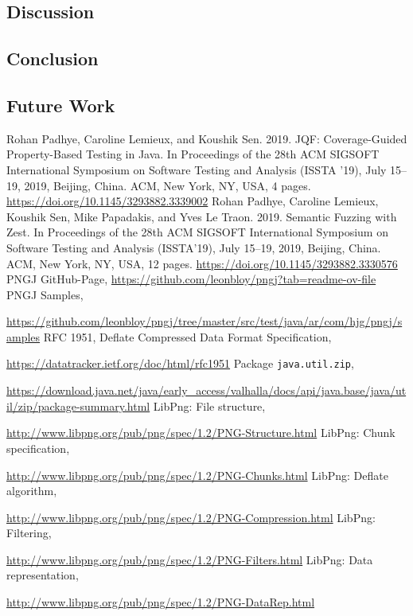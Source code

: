 \documentclass[runningheads]{llncs}
\begin{document}
\subsection{Discussion}
\subsection{Conclusion}
\subsection{Future Work}

%
%
%
% 
% 
%
\begin{thebibliography}{8}
Rohan Padhye, Caroline Lemieux, and Koushik Sen. 2019. JQF: Coverage-Guided Property-Based Testing in Java. In Proceedings of the 28th ACM SIGSOFT International Symposium on Software Testing and Analysis (ISSTA ’19), July 15–19, 2019, Beijing, China. ACM, New York, NY, USA, 4 pages. \url{https://doi.org/10.1145/3293882.3339002}
Rohan Padhye, Caroline Lemieux, Koushik Sen, Mike Papadakis, and Yves Le Traon. 2019. Semantic Fuzzing with Zest. In Proceedings of the 28th ACM SIGSOFT International Symposium on Software Testing and Analysis (ISSTA’19), July 15–19, 2019, Beijing, China. ACM, New York, NY, USA, 12 pages. \url{https://doi.org/10.1145/3293882.3330576}
PNGJ GitHub-Page, \url{https://github.com/leonbloy/pngj?tab=readme-ov-file}
PNGJ Samples, 

\url{https://github.com/leonbloy/pngj/tree/master/src/test/java/ar/com/hjg/pngj/samples}
RFC 1951, Deflate Compressed Data Format Specification,

\url{https://datatracker.ietf.org/doc/html/rfc1951}
Package \texttt{java.util.zip},

\url{https://download.java.net/java/early\_access/valhalla/docs/api/java.base/java/util/zip/package-summary.html}
LibPng: File structure,

\url{http://www.libpng.org/pub/png/spec/1.2/PNG-Structure.html}
LibPng: Chunk specification, 

\url{http://www.libpng.org/pub/png/spec/1.2/PNG-Chunks.html}
LibPng: Deflate algorithm,

\url{http://www.libpng.org/pub/png/spec/1.2/PNG-Compression.html}
LibPng: Filtering,

\url{http://www.libpng.org/pub/png/spec/1.2/PNG-Filters.html}
LibPng: Data representation,

\url{http://www.libpng.org/pub/png/spec/1.2/PNG-DataRep.html}
\end{thebibliography}
\end{document}
